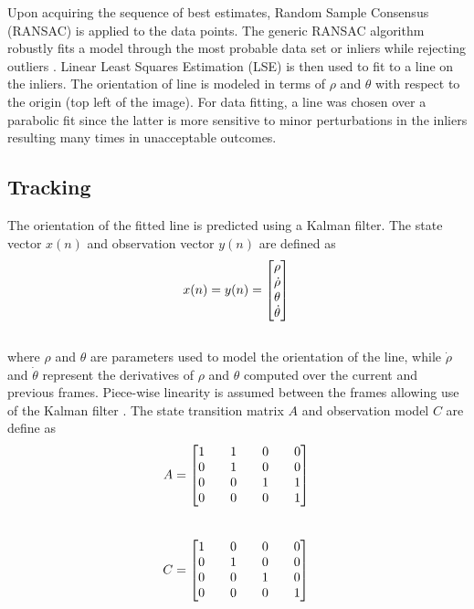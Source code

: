 \documentclass{article}
\begin{document}
Upon acquiring the sequence of best estimates, Random Sample Consensus (RANSAC) is applied to the data points. The generic RANSAC algorithm robustly fits a model through the most probable data set or inliers while rejecting outliers \cite{hartley_multiple_2004,fischler_random_1981}. Linear Least Squares Estimation (LSE) is then used to fit to a line on the inliers. The orientation of line is modeled in terms of $\rho$ and $\theta$ with respect to the origin (top left of the image). For data fitting, a line was chosen over a parabolic fit since the latter is more sensitive to minor perturbations in the inliers resulting many times in unacceptable outcomes.\\
\subsection{Tracking}
The orientation of the fitted line is predicted using a Kalman filter. The state vector $x(n)$ and observation vector $y(n)$ are defined as
\begin{equation}
x(n)= y(n)=\begin{bmatrix} \rho\\\dot{\rho}\\\theta\\\dot{\theta} \end{bmatrix}\\
\label{eq:state_measure_vectors}
\end{equation}\\
where $\rho$ and $\theta$ are parameters used to model the orientation of the line, while $\dot{\rho}$ and $\dot{\theta}$ represent the derivatives of $\rho$ and $\theta$ computed over the current and previous frames. Piece-wise linearity is assumed between the frames allowing use of the Kalman filter \cite{hayes_statistical_1996,brookner_tracking_1998}. The state transition matrix $A$ and observation model $C$ are define as
\begin{equation}
A = \begin{bmatrix} 1 && 1 && 0 && 0 \\ 0 && 1 && 0 && 0 \\ 0 && 0 && 1 && 1 \\ 0 && 0 && 0 && 1 \\\end{bmatrix}\\
\label{eq:state_trans}
\end{equation}\\
\begin{equation}
C = \begin{bmatrix} 1 && 0 && 0 && 0 \\ 0 && 1 && 0 && 0 \\ 0 && 0 && 1 && 0 \\ 0 && 0 && 0 && 1 \\\end{bmatrix}\\
\label{eq:observation_model}
\end{equation}\\
\end{document}
